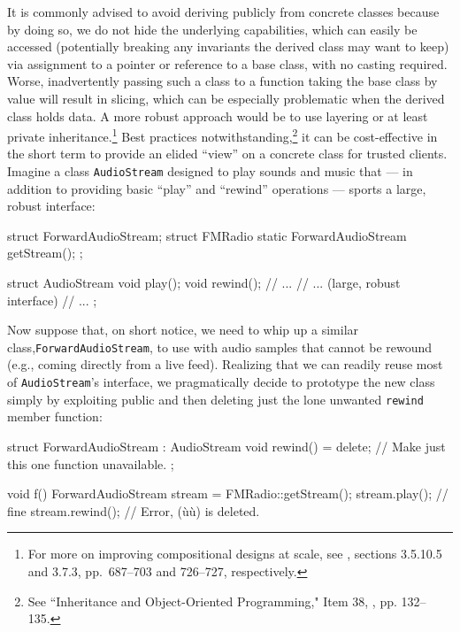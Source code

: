 It is commonly advised to avoid deriving publicly from concrete classes because by doing so, we do not hide the underlying capabilities, which can easily be accessed (potentially breaking any invariants the derived class may want to keep) via assignment to a pointer or reference to a base class, with no casting required.  Worse, inadvertently passing such a class to a function taking the base class by value will result in slicing, which can be especially problematic when the derived class holds data. A more robust approach would be to use layering or at least private inheritance.\footnote{For more on improving compositional designs at scale, see
  \cite{lakos20}, sections 3.5.10.5 and 3.7.3, pp.~687--703 and
  726--727, respectively.} Best practices notwithstanding,\footnote{See ``Inheritance and Object-Oriented Programming," Item 38, \cite{meyers92}, pp. 132--135.} it can be cost-effective in the short
term to provide an elided ``view'' on a concrete class for trusted
clients. Imagine a class \lstinline!AudioStream! designed to play sounds
and music that --- in addition to providing basic ``play'' and
``rewind'' operations --- sports a large, robust interface:

\begin{emcppshiddenlisting}[emcppsbatch=e2]
struct ForwardAudioStream;
struct FMRadio {
    static ForwardAudioStream getStream();
};
\end{emcppshiddenlisting}
\begin{emcppslisting}[emcppsbatch=e2]
struct AudioStream
{
    void play();
    void rewind();
    // ...
    // ... (large, robust interface)
    // ...
};
\end{emcppslisting}


Now suppose that, on short notice, we need to whip up a similar
class,\linebreak[4] \lstinline!ForwardAudioStream!, to use with audio samples that
cannot be rewound (e.g., coming directly from a live feed). Realizing
that we can readily reuse most of \lstinline!AudioStream!'s interface, we
pragmatically decide to prototype the new class simply by exploiting
public  and then deleting just the lone
unwanted \lstinline!rewind! member function:

\begin{emcppslisting}[emcppsbatch=e2]
struct ForwardAudioStream : AudioStream
{
    void rewind() = delete; // Make just this one function unavailable.
};

void f()
{
    ForwardAudioStream stream = FMRadio::getStream();
    stream.play();   // fine
    stream.rewind(); // Error, (ù{}ù) is deleted.
}
\end{emcppslisting}

